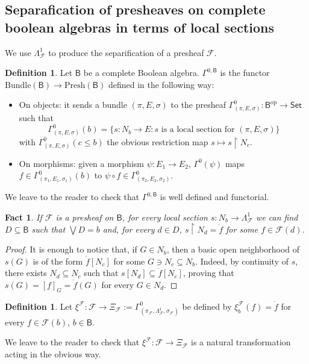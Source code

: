 \documentclass[11pt]{amsart}
\newcommand{\F}{\mathcal{F}}
\newcommand{\Presh}{\textrm{Presh}}
\newcommand{\bundle}{\textrm{Bundle}}
\theoremstyle{plain}
\newtheorem{fact}[theorem]{Fact}
\theoremstyle{definition}
\newtheorem{definition}[theorem]{Definition}
\theoremstyle{plain}
\theoremstyle{remark}
\newcommand{\dSet}{\mathsf{Set}}
\newcommand{\bool}[1]{\mathsf{#1}}
\newcommand{\0}{\mathsf{0}}
\renewcommand{\1}{\mathsf{1}}
\renewcommand{\2}{\mathsf{2}}
\theoremstyle{definition}
\begin{document}
\subsection{Separafication of presheaves on complete boolean algebras in terms of  local sections}

We use $\Lambda^1_\F$ to produce the separification of a presheaf $\F$.
\begin{definition}
\label{def:functxi}
Let $\bool{B}$ be a complete Boolean algebra. 
 $\Gamma^{0,\bool{B}}$ is the functor $\bundle(\bool{B})\to\Presh(\bool{B})$ defined in the following way: 
\begin{itemize}
\item
On objects: it sends a bundle $(\pi,E,\sigma)$ to the presheaf $\Gamma^0_{(\pi,E,\sigma)}:\bool{B}^\mathrm{op}\to\dSet$ such that 
\[\Gamma^0_{(\pi,E,\sigma)}(b)=\{s:N_b\to E: s\text{ is a local section for }(\pi,E,\sigma)\}\] 
with $\Gamma^0_{(\pi,E,\sigma)}(c\leq b)$ the obvious restriction map $s\mapsto s\restriction N_c$.
\item
On morphisms: given a morphism $\psi:E_1\to E_2$, $\Gamma^0(\psi)$ maps $f\in\Gamma^0_{(\pi_1,E_1,\sigma_1)}(b)$ to $\psi\circ f\in\Gamma^0_{(\pi_2,E_2,\sigma_2)}$.
\end{itemize}
\end{definition}\label{def:nattrxi}
We leave to the reader to check that $\Gamma^{0,\bool{B}}$ is well defined and functorial.
\begin{fact}
\label{fact:locsec}
If $\F$ is a presheaf on $\bool{B}$, for every local section $s:N_b\to \Lambda^1_\F$ we can find $D\subseteq \bool{B}$ such that $\bigvee D=b$ and, for every $d\in D$, $s\restriction N_d=\dot{f}$ for some $f\in\F(d)$.
\end{fact}
\begin{proof}
It is enough to notice that, if $G\in N_b$, then a basic open neighborhood of $s(G)$ is of the form $\dot{f}[N_c]$ for some $G\ni N_c\subseteq N_b$. Indeed, by continuity of $s$, there exists $N_d\subseteq N_c$ such that $s[N_d]\subseteq \dot{f}[N_c]$, proving that $s(G)=[f]_G=\dot{f}(G)$ for every $G\in N_d$.
\end{proof}
\begin{definition}\label{rem:isoJ-sep}
Let $\xi^{\F}:\F\to\Xi_\F:=\Gamma^0_{(\pi_\F,\Lambda^1_\F,\sigma_\F)}$ be defined by $\xi^{\F}_b(f)=\dot{f}$ for every $f\in\F(b)$, $b\in \bool{B}$.
\end{definition}
We leave to the reader to check that $\xi^{\F}:\F\to\Xi_\F$ is a natural transformation  acting in the obvious way.
\end{document}
